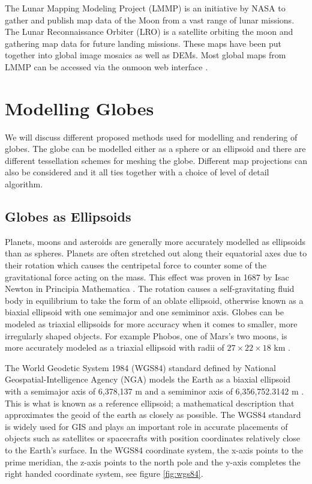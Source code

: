 The Lunar Mapping Modeling Project (LMMP) is an initiative by NASA to gather and publish map data of the Moon from a vast range of lunar missions. The Lunar Reconnaissance Orbiter (LRO) is a satellite orbiting the moon and gathering map data for future landing missions. These maps have been put together into global image mosaics as well as DEMs. Most global maps from LMMP can be accessed via the onmoon web interface \cite{onmoon}.






\section{Modelling Globes}

We will discuss different proposed methods used for modelling and rendering of globes. The globe can be modelled either as a sphere or an ellipsoid and there are different tessellation schemes for meshing the globe. Different map projections can also be considered and it all ties together with a choice of level of detail algorithm.

\subsection{Globes as Ellipsoids}

Planets, moons and asteroids are generally more accurately modelled as ellipsoids than as spheres. Planets are often stretched out along their equatorial axes due to their rotation which causes the centripetal force to counter some of the gravitational force acting on the mass. This effect was proven in 1687 by Isac Newton in Principia Mathematica \cite{newton87}. The rotation causes a self-gravitating fluid body in equilibrium to take the form of an oblate ellipsoid, otherwise known as a biaxial ellipsoid with one semimajor and one semiminor axis. Globes can be modeled as triaxial ellipsoids for more accuracy when it comes to smaller, more irregularly shaped objects. For example Phobos, one of Mars's two moons, is more accurately modeled as a triaxial ellipsoid with radii of $27 \times 22 \times 18$ km \cite{cozzi11}.

The World Geodetic System 1984 (WGS84) standard defined by National Geospatial-Intelligence Agency (NGA) models the Earth as a biaxial ellipsoid with a semimajor axis of 6,378,137 m and a semiminor axis of 6,356,752.3142 m \cite{cozzi11}. This is what is known as a reference ellipsoid; a mathematical description that approximates the geoid of the earth as closely as possible. The WGS84 standard is widely used for GIS and plays an important role in accurate placements of objects such as satellites or spacecrafts with position coordinates relatively close to the Earth's surface. In the WGS84 coordinate system, the x-axis points to the prime meridian, the z-axis points to the north pole and the y-axis completes the right handed coordinate system, see figure \ref{fig:wgs84}.

